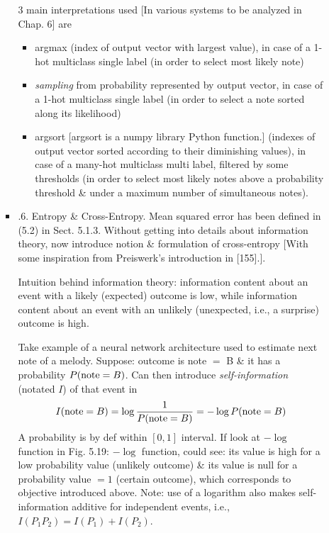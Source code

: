 \documentclass{article}
\begin{document}
\begin{itemize}
\begin{itemize}
\begin{itemize}
\begin{itemize}
			\end{itemize}
			3 main interpretations used [In various systems to be analyzed in Chap. 6] are
			\begin{itemize}
				\item argmax (index of output vector with largest value), in case of a 1-hot multiclass single label (in order to select most likely note)
				\item {\it sampling} from probability represented by output vector, in case of a 1-hot multiclass single label (in order to select a note sorted along its likelihood)
				\item argsort [argsort is a numpy library Python function.] (indexes of output vector sorted according to their diminishing values), in case of a many-hot multiclass multi label, filtered by some thresholds (in order to select most likely notes above a probability threshold \& under a maximum number of simultaneous notes).
			\end{itemize}
			\item {.6. Entropy \& Cross-Entropy.} Mean squared error has been defined in (5.2) in Sect. 5.1.3. Without getting into details about information theory, now introduce notion \& formulation of cross-entropy [With some inspiration from Preiswerk's introduction in [155].].
			
			Intuition behind information theory: information content about an event with a likely (expected) outcome is low, while information content about an event with an unlikely (unexpected, i.e., a surprise) outcome is high.
			
			Take example of a neural network architecture used to estimate next note of a melody. Suppose: outcome is note $=$ B \& it has a probability $P({\rm note} = B)$. Can then introduce {\it self-information} (notated $I$) of that event in
			\begin{equation*}
				I({\rm note} = B) = \log\frac{1}{P({\rm note} = B)} = -\log P({\rm note} = B)
			\end{equation*}
			A probability is by def within $[0,1]$ interval. If look at $-\log$ function in {\sf Fig. 5.19: $-\log$ function}, could see: its value is high for a low probability value (unlikely outcome) \& its value is null for a probability value $= 1$ (certain outcome), which corresponds to objective introduced above. Note: use of a logarithm also makes self-information additive for independent events, i.e., $I(P_1P_2) = I(P_1) + I(P_2)$.
			

\end{itemize}
\end{itemize}
\end{itemize}
\end{document}

